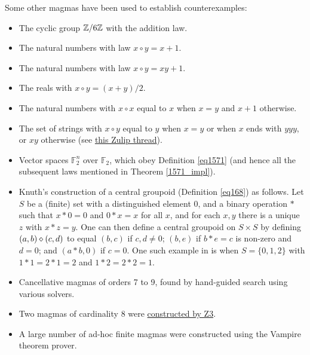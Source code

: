 Some other magmas have been used to establish counterexamples:
\begin{itemize}
  \item The cyclic group $\mathbb{Z}/6\mathbb{Z}$ with the addition law.
  \item The natural numbers with law $x \circ y = x+1$.
  \item The natural numbers with law $x \circ y = xy+1$.
  \item The reals with $x \circ y = (x+y)/2$.
  \item The natural numbers with $x \circ x$ equal to $x$ when $x=y$ and $x+1$ otherwise.
  \item The set of strings with $x \circ y$ equal to $y$ when $x=y$ or when $x$ ends with $yyy$, or $xy$ otherwise (see \href{https://leanprover.zulipchat.com/#narrow/stream/458659-Equational/topic/3102.20does.20not.20imply.203176}{this Zulip thread}).
  \item Vector spaces ${\mathbb F}_2^n$ over ${\mathbb F}_2$, which obey Definition \ref{eq1571} (and hence all the subsequent laws mentioned in Theorem \ref{1571_impl}).
  \item Knuth's construction \cite{knuth} of a central groupoid (Definition \ref{eq168}) as follows.  Let $S$ be a (finite) set with a distinguished element $0$, and a binary operation $*$ such that $x*0=0$ and $0*x=x$   for all $x$, and for each $x,y$ there is a unique $z$ with $x*z=y$.  One can then define a central groupoid on $S \times S$ by defining $(a,b) \diamond (c,d)$ to equal $(b,c)$ if $c,d \neq 0$; $(b,e)$ if $b*e=c$ is non-zero and $d=0$; and $(a*b,0)$ if $c=0$.  One such example in \cite{knuth} is when $S = \{0,1,2\}$ with $1*1=2*1=2$ and $1*2=2*2=1$.
  \item Cancellative magmas of orders 7 to 9, found by hand-guided search using various solvers.
  \item Two magmas of cardinality $8$ were \href{https://leanprover.zulipchat.com/#narrow/stream/458659-Equational/topic/using.20z3}{constructed by Z3}.
  \item A large number of ad-hoc finite magmas were constructed using the Vampire theorem prover.
\end{itemize}
